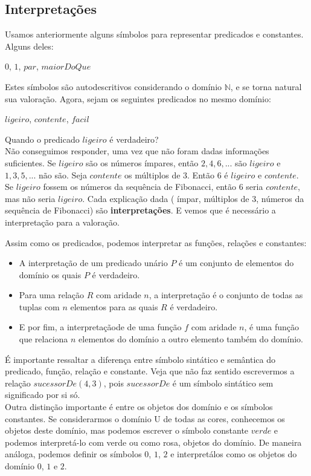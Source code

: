     \subsection{Interpretações}
    
    Usamos anteriormente alguns símbolos para representar predicados e constantes. Alguns deles:
    
    \begin{center}
        $0$, $1$, $ par$, $maiorDoQue$
    \end{center}
    
    
    Estes símbolos são autodescritivos considerando o domínio $\mathbb{N}$, e se torna natural sua valoração. Agora, sejam os seguintes predicados no mesmo domínio:
    
    \begin{center}
        $ligeiro$, $contente$, $facil$
    \end{center}
    
    Quando o predicado $ligeiro$ é verdadeiro? \\
    Não conseguimos responder, uma vez que não foram dadas informações suficientes.
    Se $ligeiro$ são os números ímpares, então $2, 4, 6, ...$ são  $ligeiro$ e   $1, 3, 5, ...$ não são. Seja $contente$ os múltiplos de $3$. Então $6$ é $ligeiro$ e $contente$. Se $ligeiro$ fossem os números da sequência de Fibonacci, então $6$ seria $contente$, mas não seria $ligeiro$.
    Cada explicação dada ( ímpar, múltiplos de $3$, números da sequência de Fibonacci) são \textbf{interpretações}. E vemos que é necessário a interpretação para a valoração. 
    
    
    Assim como os predicados, podemos interpretar as funções, relações e constantes:
    
    \begin{itemize}
        \item A interpretação de um predicado unário $P$ é um conjunto de elementos do domínio os quais $P$ é verdadeiro. 
        \item Para uma relação $R$ com aridade $n$, a interpretação é o conjunto de todas as tuplas com $n$ elementos para as quais $R$ é verdadeiro.
        \item E por fim, a interpretaçãode de uma função $f$ com aridade $n$, é uma função que relaciona $n$ elementos do domínio a outro elemento também do domínio.\\
     \end{itemize}
     
     É importante ressaltar a diferença entre símbolo sintático e semântica do predicado, função, relação e constante. Veja que não faz sentido escrevermos a relação $sucessorDe(4,3)$, pois $sucessorDe$ é um símbolo sintático sem significado por si só. \\
     Outra distinção importante é entre os objetos dos domínio e os símbolos constantes. Se considerarmos o domínio U de todas as cores, conhecemos os objetos deste domínio, mas podemos escrever o símbolo constante $verde$ e podemos interpretá-lo com verde ou como rosa, objetos do domínio.
     De maneira análoga, podemos definir os símbolos $0$, $1$, $2$ e interpretálos como os objetos do domínio $0$, $1$ e $2$.
     
